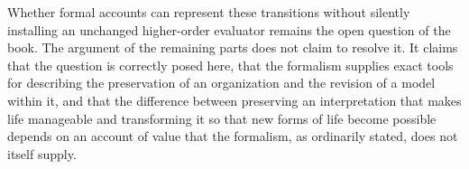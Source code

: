 Whether formal accounts can represent these transitions without silently installing an unchanged higher-order evaluator remains the open question of the book. The argument of the remaining parts does not claim to resolve it. It claims that the question is correctly posed here, that the formalism supplies exact tools for describing the preservation of an organization and the revision of a model within it, and that the difference between preserving an interpretation that makes life manageable and transforming it so that new forms of life become possible depends on an account of value that the formalism, as ordinarily stated, does not itself supply.
